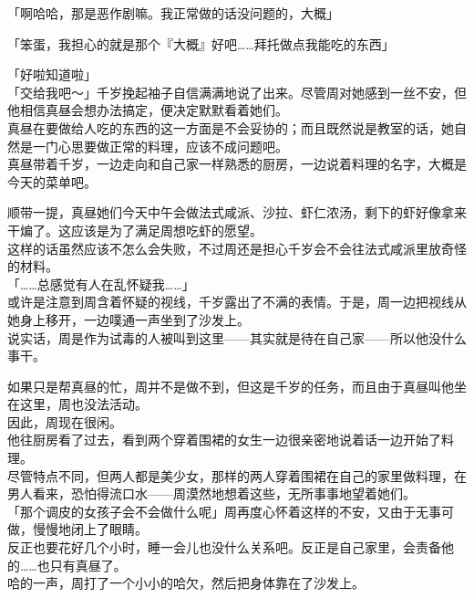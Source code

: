 「啊哈哈，那是恶作剧嘛。我正常做的话没问题的，大概」

「笨蛋，我担心的就是那个『大概』好吧……拜托做点我能吃的东西」

「好啦知道啦」\\

「交给我吧～」千岁挽起袖子自信满满地说了出来。尽管周对她感到一丝不安，但他相信真昼会想办法搞定，便决定默默看着她们。\\

真昼在要做给人吃的东西的这一方面是不会妥协的；而且既然说是教室的话，她自然是一门心思要做正常的料理，应该不成问题吧。\\

真昼带着千岁，一边走向和自己家一样熟悉的厨房，一边说着料理的名字，大概是今天的菜单吧。

顺带一提，真昼她们今天中午会做法式咸派、沙拉、虾仁浓汤，剩下的虾好像拿来干煸了。这应该是为了满足周想吃虾的愿望。\\

这样的话虽然应该不怎么会失败，不过周还是担心千岁会不会往法式咸派里放奇怪的材料。\\

「……总感觉有人在乱怀疑我……」\\

或许是注意到周含着怀疑的视线，千岁露出了不满的表情。于是，周一边把视线从她身上移开，一边噗通一声坐到了沙发上。\\

说实话，周是作为试毒的人被叫到这里——其实就是待在自己家——所以他没什么事干。

如果只是帮真昼的忙，周并不是做不到，但这是千岁的任务，而且由于真昼叫他坐在这里，周也没法活动。\\

因此，周现在很闲。\\

他往厨房看了过去，看到两个穿着围裙的女生一边很亲密地说着话一边开始了料理。\\

尽管特点不同，但两人都是美少女，那样的两人穿着围裙在自己的家里做料理，在男人看来，恐怕得流口水——周漠然地想着这些，无所事事地望着她们。\\

「那个调皮的女孩子会不会做什么呢」周再度心怀着这样的不安，又由于无事可做，慢慢地闭上了眼睛。\\

反正也要花好几个小时，睡一会儿也没什么关系吧。反正是自己家里，会责备他的……也只有真昼了。\\

哈的一声，周打了一个小小的哈欠，然后把身体靠在了沙发上。
